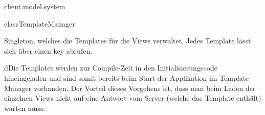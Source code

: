 \begin{texdocpackage}{client.model.system}
\begin{texdocclass}{class}{TemplateManager}
\label{texdoclet:edu.kit.informatik.studyplan.client.model.system.TemplateManager}
\begin{texdocclassintro}
Singleton, welches die Templates für die Views verwaltet. Jedes Template
 lässt sich über einen key abrufen.\texdocbr{}

 dDie Templates werden zur Compile-Zeit in den Initialisierungscode
 hineingeladen und sind somit bereits beim Start der Applikation im Template
 Manager vorhanden. Der Vorteil dieses Vorgehens ist, dass man beim Laden der
 einzelnen Views nicht auf eine Antwort vom Server (welche das Template
 enthält) warten muss.\end{texdocclassintro}
\begin{texdocclassconstructors}
\end{texdocclassconstructors}
\begin{texdocclassmethods}
\end{texdocclassmethods}
\end{texdocclass}


\end{texdocpackage}



